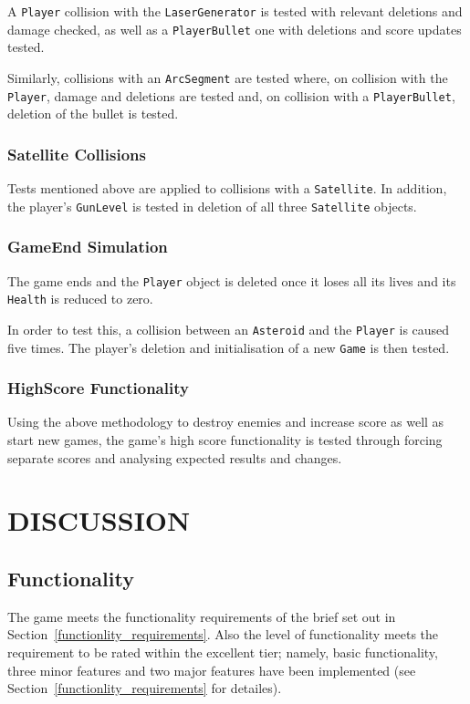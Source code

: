 \documentclass[10pt,twocolumn]{witseiepaper}
\begin{document}
A \texttt{Player} collision with the \texttt{LaserGenerator} is tested with relevant deletions and damage checked, as well as a \texttt{PlayerBullet} one with deletions and score updates tested. 

Similarly, collisions with an \texttt{ArcSegment} are tested where, on collision with the \texttt{Player}, damage and deletions are tested and, on collision with a \texttt{PlayerBullet}, deletion of the bullet is tested.
\subsubsection{Satellite Collisions}
Tests mentioned above are applied to collisions with a \texttt{Satellite}. In addition, the player's \texttt{GunLevel} is tested in deletion of all three \texttt{Satellite} objects.
\subsubsection{GameEnd Simulation}
The game ends and the \texttt{Player} object is deleted once it loses all its lives and its \texttt{Health} is reduced to zero.

In order to test this, a collision between an \texttt{Asteroid} and the \texttt{Player} is caused five times. The player's deletion and initialisation of a new \texttt{Game} is then tested.
\subsubsection{HighScore Functionality}
Using the above methodology to destroy enemies and increase score as well as start new games, the game's high score functionality is tested through forcing separate scores and analysing expected results and changes. 
\section{DISCUSSION}
\subsection{Functionality}

The game meets the functionality requirements of the brief set out in Section~\ref{functionlity_requirements}. Also the level of functionality meets the requirement to be rated within the excellent tier; namely, basic functionality, three minor features and two major features have been implemented (see Section~\ref{functionlity_requirements} for detailes). 
\end{document}

